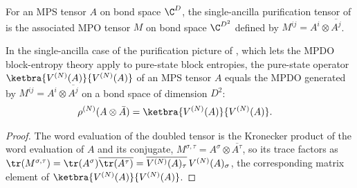 \begin{definition}\label{def:doubled_tensor}
    \leanok
    For an MPS tensor $A$ on bond space $\C^D$, the single-ancilla
    purification tensor of \cite{Cirac2016MPDO_arXiv} is the associated MPO
    tensor $M$ on bond space $\C^{D^2}$ defined by
    $M^{ij}=A^i\otimes\overline{A^j}$.
\end{definition}

\begin{lemma}\label{lem:mpo_doubled}
    \leanok
    In the single-ancilla case of the purification picture of
    \cite{Cirac2016MPDO_arXiv}, which lets the MPDO block-entropy theory apply
    to pure-state block entropies, the pure-state operator
    $\ketbra{V^{(N)}(A)}{V^{(N)}(A)}$ of an MPS tensor $A$ equals the MPDO
    generated by $M^{ij}=A^i\otimes\overline{A^j}$ on a bond space of
    dimension $D^2$:
    \begin{align}
        \rho^{(N)}(A\otimes\bar A)
         & =\ketbra{V^{(N)}(A)}{V^{(N)}(A)}.
        \notag
    \end{align}
\end{lemma}
\begin{proof}\leanok
    The word evaluation of the doubled tensor is the Kronecker product of the
    word evaluation of $A$ and its conjugate,
    $M^{\sigma,\tau}=A^\sigma\otimes\overline{A^\tau}$,
    so its trace factors as
    $\tr(M^{\sigma,\tau})
        =\tr(A^\sigma) \overline{\tr(A^\tau)}
        =\overline{V^{(N)}(A)_\tau}\,V^{(N)}(A)_\sigma$,
    the corresponding matrix element of
    $\ketbra{V^{(N)}(A)}{V^{(N)}(A)}$.
\end{proof}

